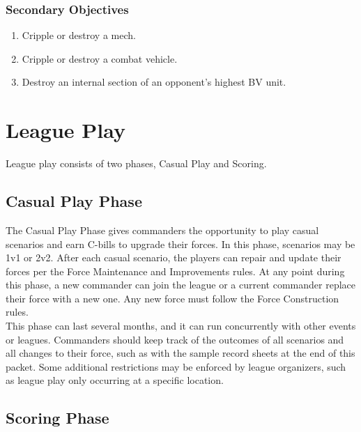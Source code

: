 \documentclass{article}
\begin{document}
\subsubsection{Secondary Objectives}

\begin{enumerate}

\item Cripple or destroy a mech.

\item Cripple or destroy a combat vehicle.

\item Destroy an internal section of an opponent's highest BV unit.

\end{enumerate}

\newpage

\section{League Play}

League play consists of two phases, Casual Play and Scoring.

\subsection{Casual Play Phase}

The Casual Play Phase gives commanders the opportunity to play casual scenarios and earn C-bills to upgrade their forces.
In this phase, scenarios may be 1v1 or 2v2.
After each casual scenario, the players can repair and update their forces per the Force Maintenance and Improvements rules.
At any point during this phase, a new commander can join the league or a current commander replace their force with a new one.
Any new force must follow the Force Construction rules.\\

This phase can last several months, and it can run concurrently with other events or leagues.
Commanders should keep track of the outcomes of all scenarios and all changes to their force, such as with the sample record sheets at the end of this packet.
Some additional restrictions may be enforced by league organizers, such as league play only occurring at a specific location.

\subsection{Scoring Phase}
\end{document}
